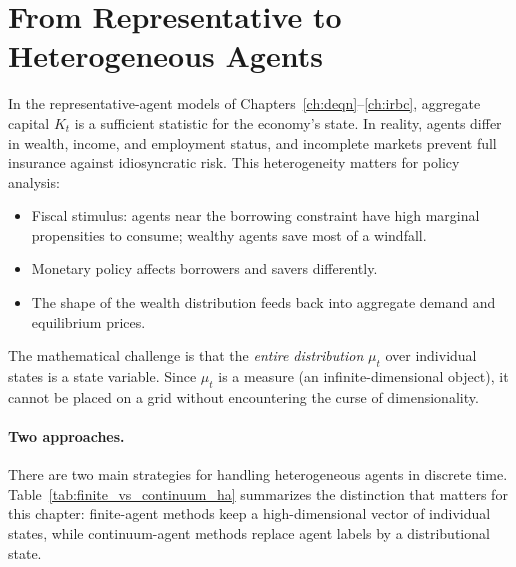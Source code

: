 \documentclass[11pt,a4paper]{report}
\begin{document}
\section{From Representative to Heterogeneous Agents}
\label{sec:young_motivation}

In the representative-agent models of Chapters~\ref{ch:deqn}--\ref{ch:irbc}, aggregate capital $K_t$ is a sufficient statistic for the economy's state.  In reality, agents differ in wealth, income, and employment status, and incomplete markets prevent full insurance against idiosyncratic risk.  This heterogeneity matters for policy analysis:

\begin{itemize}[itemsep=2pt]
\item Fiscal stimulus: agents near the borrowing constraint have high marginal propensities to consume; wealthy agents save most of a windfall.
\item Monetary policy affects borrowers and savers differently.
\item The shape of the wealth distribution feeds back into aggregate demand and equilibrium prices.
\end{itemize}

The mathematical challenge is that the \emph{entire distribution} $\mu_t$ over individual states is a state variable.  Since $\mu_t$ is a measure (an infinite-dimensional object), it cannot be placed on a grid without encountering the curse of dimensionality.

\paragraph{Two approaches.}
There are two main strategies for handling heterogeneous agents in discrete time.  Table~\ref{tab:finite_vs_continuum_ha} summarizes the distinction that matters for this chapter: finite-agent methods keep a high-dimensional vector of individual states, while continuum-agent methods replace agent labels by a distributional state.
\end{document}

